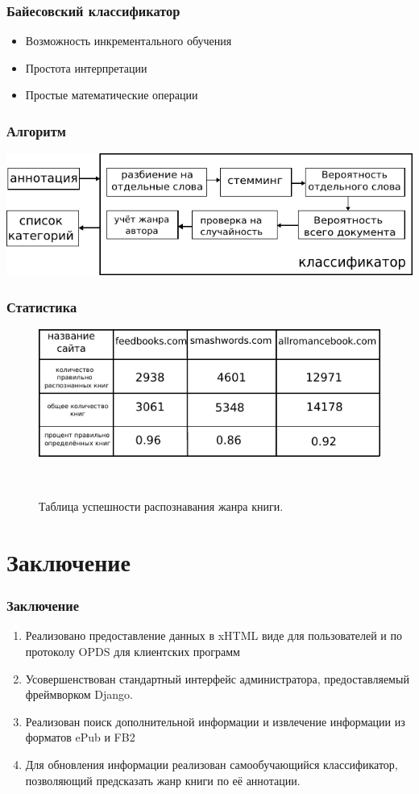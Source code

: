 \documentclass[utf8,handout]{beamer}
\begin{document}
\begin{frame}
	\frametitle{Байесовский классификатор}
	  \begin{itemize}
	    \item Возможность инкрементального обучения
	    \item Простота интерпретации
	    \item Простые математические операции
	  \end{itemize}
	   		  
\end{frame}


\begin{frame}
	\frametitle{Алгоритм}
      \includegraphics[width=1.05\textwidth]{./classifier}
\end{frame}

\begin{frame}
	\frametitle{Статистика}
   \begin{figure}
	  \centering
	  \includegraphics[width=.7\textwidth]{./statistics}
	  
	  \ 
	  \ 
	  
	  Таблица успешности распознавания жанра книги.
   \end{figure} 
\end{frame}


\section{Заключение}
  \begin{frame}
    \frametitle{Заключение}
    \begin{enumerate}
      \item Реализовано предоставление данных в xHTML виде для пользователей и по протоколу OPDS для клиентских программ	  
	  \item Усовершенствован стандартный интерфейс администратора, предоставляемый фреймворком Django.
	  \item Реализован поиск дополнительной информации и извлечение информации из форматов ePub и FB2
      \item Для обновления информации реализован самообучающийся классификатор, позволяющий предсказать жанр книги по её аннотации.
	  
    \end{enumerate}
  \end{frame}
\end{document}
